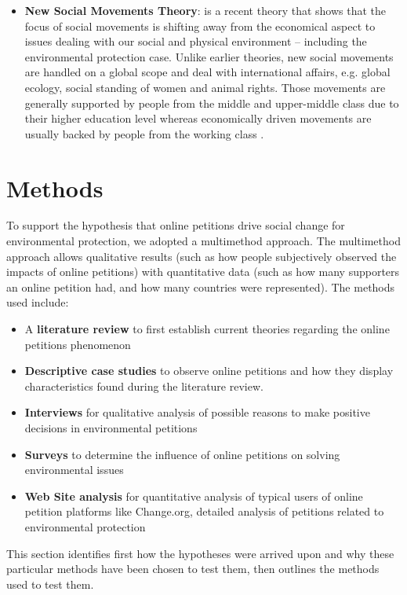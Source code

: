 \begin{itemize}
    \item\textbf{New Social Movements Theory}: is a recent theory that shows that the focus of social movements is shifting away from the economical aspect to issues dealing with our social and physical environment -- including the environmental protection case. Unlike earlier theories, new social movements are handled on a global scope and deal with international affairs, e.g. global ecology, social standing of women and animal rights. Those movements are generally supported by people from the middle and upper-middle class due to their higher education level whereas economically driven movements are usually backed by people from the working class \citep[pg. 554f]{Macionis12}.
\end{itemize}

\section{Methods}
\label{sec:methods}
To support the hypothesis that online petitions drive social change for environmental protection, we adopted a multimethod approach. The multimethod approach allows qualitative results (such as how people subjectively observed the impacts of online petitions) with quantitative data (such as how many supporters an online petition had, and how many countries were represented). The methods used include:
\begin{itemize}
 \item A \textbf{literature review} to first establish current theories regarding the online petitions phenomenon
 \item\textbf {Descriptive case studies} to observe online petitions and how they display characteristics found during the literature review.
 \item \textbf{Interviews} for qualitative analysis of possible reasons to make positive decisions in environmental petitions
 \item \textbf{Surveys} to determine the influence of online petitions on solving environmental issues
 \item \textbf{Web Site analysis} for quantitative analysis of typical users of online petition platforms like Change.org, detailed analysis of petitions related to environmental protection 
\end{itemize}
This section identifies first how the hypotheses were arrived upon and why these particular methods have been chosen to test them, then outlines the methods used to test them.

